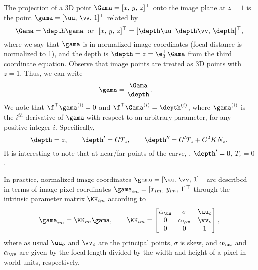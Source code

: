 The projection of a 3D point $\Gama = [x,\, y,\, z]^\top$ onto the image plane
at $z=1$ is the point $\gama = [\uu,\,\vv,\,1]^\top$ related by
\begin{equation}\label{eq:projection} \Gama =
\depth\gama\,\,\,\,\text{or}\,\,\,\, [x,\, y,\, z]^\top =
[\depth\uu,\,\depth\vv,\,\depth]^\top,
\end{equation}
where we say that $\gama$ is in normalized image coordinates (focal distance is
normalized to 1), and the depth is $\depth = z = \e_3^\top\Gama$%
%
from the third coordinate equation. Observe that image points are treated as 3D points
with $z = 1$. Thus, we can write
\begin{align}
\gama &= \frac{\Gama}{\depth}.
\label{eq:projection:isolated:gamma}
\end{align}
We note that $\f^\top\gama^{(i)} = 0$ and $\f^\top\Gama^{(i)} = \depth^{(i)}$,
where $\gama^{(i)}$ is the $i^{th}$ derivative of $\gama$ with respect to an
arbitrary parameter, for any positive integer $i$. Specifically, 
\begin{equation}\label{eq:depth:derivs}
\depth = z,\qquad \depth' = G T_z,\qquad \depth'' = G'T_z +
G^2K N_z.
\end{equation}
It is interesting to note that at near/far points of the curve, \ie, $\depth' =
0$, $T_z = 0$. 

In practice, normalized image coordinates $\gama = 
[\uu,\,\vv,\,1]^\top $ are described in terms of image
pixel coordinates $\gama_{im} = 
[x_{im},\, y_{im},\, 1]^\top$ through the 
intrinsic parameter matrix $\KK_{im}$ according to
\begin{equation}\label{eq:intrinsic:parameter:transf}
\gama_{im} = \KK_{im}\gama,
\ \ \ \ \ \
\KK_{im} = \begin{bmatrix}
\alpha_\uu & \sigma & \uu_o\\
0 &\alpha_\vv &  \vv_o\\
0 & 0 &  1
\end{bmatrix},
\end{equation}
where as usual $\uu_o$ and $\vv_o$ are the principal points, $\sigma$ is skew, and
$\alpha_\uu$ and $\alpha_\vv$ are given by the focal length divided by the width and
height of a pixel in world units, respectively.

